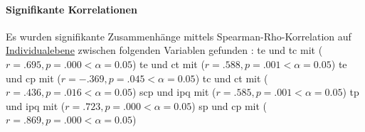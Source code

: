 \documentclass[a4paper,11pt]{article}%
\renewcommand{\\}{\vspace*{0.5\baselineskip} \newline}
\begin{document}
\paragraph{Signifikante Korrelationen}
Es wurden signifikante Zusammenhänge mittels Spearman-Rho-Korrelation auf \underline{Individualebene} zwischen folgenden Variablen gefunden :\newline
\ac{te} und \ac{tc} mit ($r = .695, p = .000 < \alpha = 0.05$)\newline
\ac{te} und \ac{ct} mit ($r = .588, p = .001 < \alpha = 0.05$)\newline
\ac{te} und \ac{cp} mit ($r = -.369, p = .045 < \alpha = 0.05$)\newline
\ac{tc} und \ac{ct} mit ($r = .436, p = .016 < \alpha = 0.05$)\newline
\ac{scp} und \ac{ipq} mit ($r = .585, p = .001 < \alpha = 0.05$)\newline
\ac{tp} und \ac{ipq} mit ($r = .723, p = .000 < \alpha = 0.05$)\newline
\ac{sp} und \ac{cp} mit ($r = .869, p = .000 < \alpha = 0.05$)\newline
\end{document}
